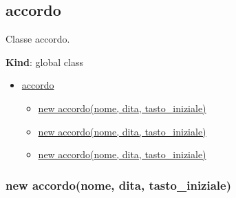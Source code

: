 \protect\hypertarget{accordo}{}{}

\hypertarget{accordo-1}{%
\subsection{accordo}\label{accordo-1}}

Classe accordo.

\textbf{Kind}: global class

\begin{itemize}
\tightlist
\item
  \protect\hyperlink{accordo}{accordo}

  \begin{itemize}
  \tightlist
  \item
    \protect\hyperlink{new_accordo_new}{new accordo(nome, dita,
    tasto\_iniziale)}
  \item
    \protect\hyperlink{new_accordo_new}{new accordo(nome, dita,
    tasto\_iniziale)}
  \item
    \protect\hyperlink{new_accordo_new}{new accordo(nome, dita,
    tasto\_iniziale)}
  \end{itemize}
\end{itemize}

\protect\hypertarget{new_accordo_new}{}{}

\hypertarget{new-accordonome-dita-tasto_iniziale-3}{%
\subsubsection{new accordo(nome, dita,
tasto\_iniziale)}\label{new-accordonome-dita-tasto_iniziale-3}}

